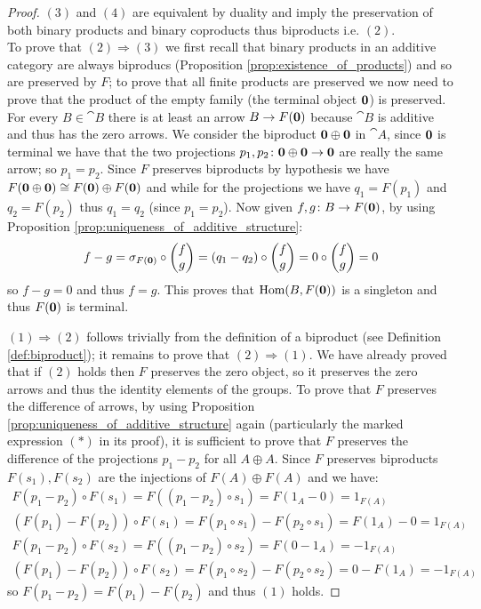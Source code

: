 \begin{proof}
  \((3)\) and \((4)\) are equivalent by duality and imply the preservation of both binary products and binary coproducts thus biproducts i.e. \((2)\).\\
  To prove that \((2)\Rightarrow(3)\) we first recall that binary products in an additive category are always biproducs (Proposition \ref{prop:existence_of_products}) and so are preserved by \(F\); to prove that all finite products are preserved we now need to prove that the product of the empty family (the terminal object \({\bf 0}\)) is preserved. For every \(B\in\cat{B}\) there is at least an arrow \(B\to F({\bf 0})\) because \(\cat{B}\) is additive and thus has the zero arrows. We consider the biproduct \({\bf 0}\oplus{\bf 0}\) in \(\cat{A}\), since \({\bf 0}\) is terminal we have that the two projections \(p_1,p_2\colon{\bf 0}\oplus{\bf 0}\to{\bf 0}\) are really the same arrow; so \(p_1=p_2\). Since \(F\) preserves biproducts by hypothesis we have \(F({\bf 0}\oplus{\bf 0})\cong F({\bf 0})\oplus F({\bf 0})\) and while for the projections we have \(q_1=F(p_1)\) and \(q_2=F(p_2)\) thus \(q_1= q_2\) (since \(p_1=p_2\)). Now given \(f,g\colon B\to F({\bf 0})\), by using Proposition \ref{prop:uniqueness_of_additive_structure}:
  \begin{gather*}
    f - g = \sigma_{F({\bf 0})}\circ\begin{pmatrix}f\\ g\end{pmatrix} = (q_1 - q_2)\circ\begin{pmatrix}f\\ g\end{pmatrix} = 0\circ\begin{pmatrix}f\\ g\end{pmatrix} = 0
  \end{gather*}
  so \(f - g = 0\) and thus \(f = g\). This proves that \(\text{Hom}(B, F({\bf 0}))\) is a singleton and thus \(F({\bf 0})\) is terminal.

  \((1)\Rightarrow(2)\) follows trivially from the definition of a biproduct (see Definition \ref{def:biproduct}); it remains to prove that \((2)\Rightarrow(1)\). We have already proved that if \((2)\) holds then \(F\) preserves the zero object, so it preserves the zero arrows and thus the identity elements of the groups. To prove that \(F\) preserves the difference of arrows, by using Proposition \ref{prop:uniqueness_of_additive_structure} again (particularly the marked expression \((*)\) in its proof), it is sufficient to prove that \(F\) preserves the difference of the projections \(p_1-p_2\) for all \(A\oplus A\). Since \(F\) preserves biproducts \(F(s_1),F(s_2)\) are the injections of \(F(A)\oplus F(A)\) and we have:
  \begin{gather*}
    F(p_1 - p_2) \circ F(s_1) = F((p_1 - p_2)\circ s_1) = F(1_A- 0) = 1_{F(A)}\\
    (F(p_1) - F(p_2))\circ F(s_1) = F(p_1\circ s_1) - F(p_2\circ s_1) = F(1_A) - 0 = 1_{F(A)}\\
    F(p_1 - p_2) \circ F(s_2) = F((p_1 - p_2)\circ s_2) = F(0 - 1_A) = -1_{F(A)}\\
    (F(p_1) - F(p_2))\circ F(s_2) = F(p_1\circ s_2) - F(p_2\circ s_2) = 0 - F(1_A) = -1_{F(A)}
  \end{gather*}
  so \(F(p_1 - p_2) = F(p_1) - F(p_2)\) and thus \((1)\) holds.
\end{proof}

